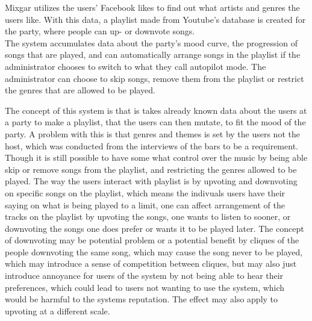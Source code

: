 Mixgar utilizes the users' Facebook likes to find out what artists and genres the users like. With this data, a playlist made from Youtube's database is created for the party, where people can up- or downvote songs.\\

The system accumulates data about the party's mood curve, the progression of songs that are played, and can automatically arrange songs in the playlist if the administrator chooses to switch to what they call autopilot mode.
The administrator can choose to skip songs, remove them from the playlist or restrict the genres that are allowed to be played.

The concept of this system is that is takes already known data about the users at a party to make a playlist, that the users can then mutate, to fit the mood of the party. A problem with this is that genres and themes is set by the users not the host, which was conducted from the interviews of the bars to be a requirement. Though it is still possible to have some what control over the music by being able skip or remove songs from the playlist, and restricting the genres allowed to be played. The way the users interact with playlist is by upvoting and downvoting on specific songs on the playlist, which means the indivuals users have their saying on what is being played to a limit, one can affect arrangement of the tracks on the playlist by upvoting the songs, one wants to listen to sooner, or downvoting the songs one does prefer or wants it to be played later. The concept of downvoting may be potential problem or a potential benefit by cliques of the people downvoting the same song, which may cause the song never to be played, which may introduce a sense of competition between cliques, but may also just introduce annoyance for users of the system by not being able to hear their preferences, which could lead to users not wanting to use the system, which would be harmful to the systems reputation. The effect may also apply to upvoting at a different scale.
